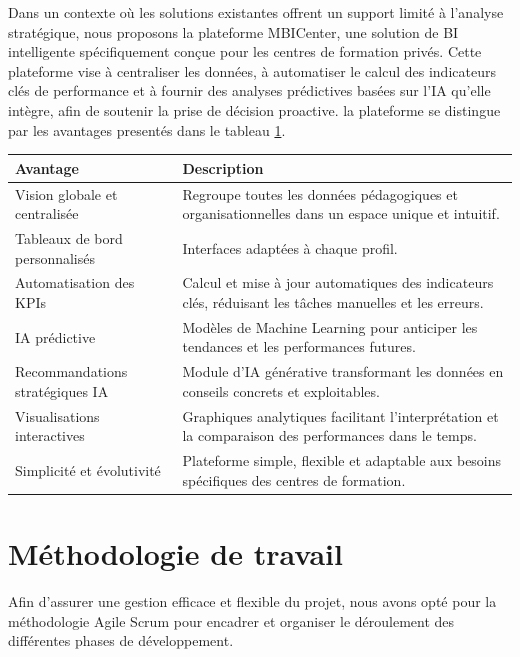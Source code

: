 Dans un contexte où les solutions existantes offrent un support limité à l’analyse stratégique, nous proposons la plateforme MBICenter, une solution de BI intelligente spécifiquement conçue pour les centres de formation privés. Cette plateforme vise à centraliser les données, à automatiser le calcul des indicateurs clés de performance et à fournir des analyses prédictives basées sur l’IA qu’elle intègre, afin de soutenir la prise de décision proactive.
la plateforme se distingue par les avantages presentés dans le tableau \ref{tab:avantages}.
\begin{table}[H]
\centering
{}
\label{tab:avantages}
\renewcommand{\arraystretch}{1.4}

\begin{tabular}{|p{4.5cm}|p{9cm}|}
\hline
\rowcolor{gray!20}
\textbf{Avantage} & \textbf{Description} \\
\hline
Vision globale et centralisée & Regroupe toutes les données pédagogiques et organisationnelles dans un espace unique et intuitif. \\
\hline
Tableaux de bord personnalisés & Interfaces adaptées à chaque profil. \\
\hline
Automatisation des KPIs & Calcul et mise à jour automatiques des indicateurs clés, réduisant les tâches manuelles et les erreurs. \\
\hline
IA prédictive & Modèles de Machine Learning pour anticiper les tendances et les performances futures. \\
\hline
Recommandations stratégiques IA & Module d’IA générative transformant les données en conseils concrets et exploitables. \\
\hline
Visualisations interactives & Graphiques analytiques facilitant l’interprétation et la comparaison des performances dans le temps. \\
\hline
Simplicité et évolutivité & Plateforme simple, flexible et adaptable aux besoins spécifiques des centres de formation. \\
\hline
\end{tabular}
\end{table}

\section{Méthodologie de travail }
\label{sec:Méthodologie de travail }
Afin d’assurer une gestion efficace et flexible du projet, nous avons opté pour la méthodologie Agile Scrum pour encadrer et organiser le déroulement des différentes phases de développement.
